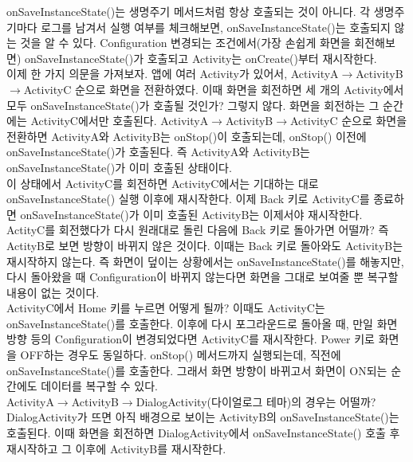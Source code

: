 onSaveInstanceState()는 생명주기 메서드처럼 항상 호출되는 것이 아니다.
각 생명주기마다 로그를 남겨서 실행 여부를 체크해보면, onSaveInstanceState()는 호출되지 않는 것을 알 수 있다. 
Configuration 변경되는 조건에서(가장 손쉽게 화면을 회전해보면) onSaveInstanceState()가 호출되고 Activity는 onCreate()부터 재시작한다.\\

이제 한 가지 의문을 가져보자.
앱에 여러 Activity가 있어서, ActivityA$\rightarrow$ActivityB$\rightarrow$ActivityC 순으로 화면을 전환하였다. 이때 화면을 회전하면 세 개의 Activity에서 모두 onSaveInstanceState()가 호출될 것인가? 그렇지 않다. 화면을 회전하는 그 순간에는 ActivityC에서만 호출된다.
ActivityA$\rightarrow$ActivityB$\rightarrow$ActivityC 순으로 화면을 전환하면 ActivityA와 ActivityB는 onStop()이 호출되는데, onStop() 이전에 onSaveInstanceState()가 호출된다.
즉 ActivityA와 ActivityB는 onSaveInstanceState()가 이미 호출된 상태이다.\\

이 상태에서 ActivityC를 회전하면 ActivityC에서는 기대하는 대로 onSaveInstanceState() 실행 이후에 재시작한다.
이제 Back 키로 ActivityC를 종료하면 onSaveInstanceState()가 이미 호출된 ActivityB는 이제서야 재시작한다.\\

ActityC를 회전했다가 다시 원래대로 돌린 다음에 Back 키로 돌아가면 어떨까? 즉 ActityB로 보면 방향이 바뀌지 않은 것이다.
이때는 Back 키로 돌아와도 ActivityB는 재시작하지 않는다. 즉 화면이 덮이는 상황에서는 onSaveInstanceState()를 해놓지만, 다시 돌아왔을 때 Configuration이 바뀌지 않는다면 화면을 그대로 보여줄 뿐 복구할 내용이 없는 것이다.\\

ActivityC에서 Home 키를 누르면 어떻게 될까? 이때도 ActivityC는 onSaveInstanceState()를 호출한다.
이후에 다시 포그라운드로 돌아올 때, 만일 화면 방향 등의 Configuration이 변경되었다면 ActivityC를 재시작한다. Power 키로 화면을 OFF하는 경우도 동일하다. onStop() 메서드까지 실행되는데, 직전에 onSaveInstanceState()를 호출한다. 그래서 화면 방향이 바뀌고서 화면이 ON되는 순간에도 데이터를 복구할 수 있다.\\

ActivityA$\rightarrow$ActivityB$\rightarrow$DialogActivity(다이얼로그 테마)의 경우는 어떨까?
DialogActivity가 뜨면 아직 배경으로 보이는 ActivityB의 onSaveInstanceState()는 호출된다.
이때 화면을 회전하면 DialogActivity에서 onSaveInstanceState() 호출 후 재시작하고 그 이후에 ActivityB를 재시작한다.\\

